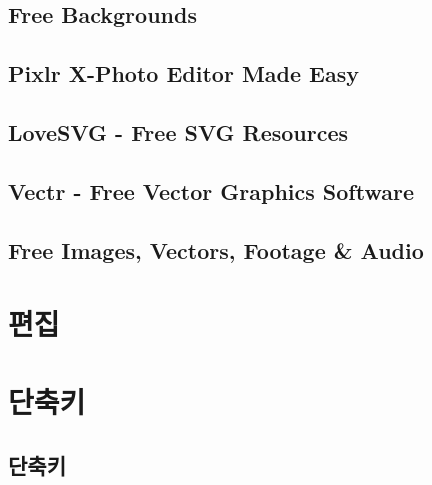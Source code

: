 \documentclass[12pt, a4paper, oneside]{book}
\let\stdsection\section
\renewcommand\section{\newpage\stdsection}
\begin{document}
\section{	Free 	Backgrounds			}							
\section{	Pixlr X-Photo Editor Made Easy				}							
\section{	LoveSVG - Free SVG Resources				}							
\section{	Vectr - Free Vector Graphics Software				}							
\section{	Free Images, Vectors, Footage \& Audio				}							



	\chapter{편집} 
	\noptcrule
	\newpage
	\minitoc				



	\chapter{단축키} 
	\minitoc

	\section{	단축키				}
																		
\end{document}
